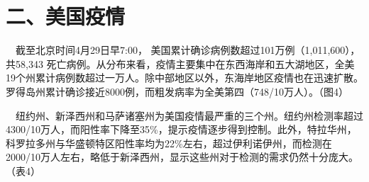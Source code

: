 \documentclass[]{article}
\begin{document}
\newpage

\hypertarget{section-3}{%
\section{\texorpdfstring{\textcolor{glaucous}{二、美国疫情}}{}}\label{section-3}}

\vspace{-5mm}

\(\quad\)截至北京时间4月29日早7:00，
美国累计确诊病例数超过101万例（1,011,600），共58,343
死亡病例。从分布来看，疫情主要集中在东西海岸和五大湖地区，全美19个州累计病例数超过一万人。除中部地区以外，东海岸地区疫情也在迅速扩散。罗得岛州累计确诊接近8000例，而粗发病率为全美第四（748/10万人）。（图4）

\(\quad\)纽约州、新泽西州和马萨诸塞州为美国疫情最严重的三个州。纽约州检测率超过4300/10万人，而阳性率下降至35\%，提示疫情逐步得到控制。此外，特拉华州，科罗拉多州与华盛顿特区阳性率均为22\%左右，超过伊利诺伊州，而检测在2000/10万人左右，略低于新泽西州，显示这些州对于检测的需求仍然十分庞大。（表4）
\end{document}
